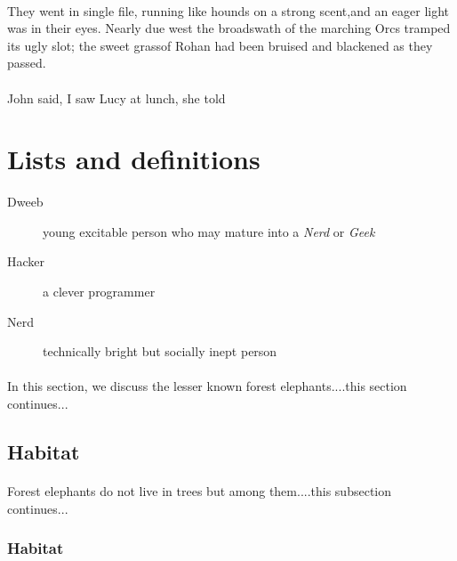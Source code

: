 \documentclass{article}
\begin{document}
\paragraph{}\begin{center}They went in single file, running like hounds on a strong scent,and an eager light was in their eyes. Nearly due west the broadswath of the marching  \small{Orcs tramped }  its ugly slot; the sweet grassof Rohan had been bruised and blackened as they passed. \end{center}\paragraph{}\paragraph{}John said, I saw Lucy at lunch, she told \section*{Lists and definitions }
\begin{description}\item[Dweeb ]
young excitable person who may mature    into a  \emph{Nerd } or  \emph{Geek }\item[Hacker ]
a clever programmer \item[Nerd ]
technically bright but socially inept person \end{description}\paragraph{}In this section, we discuss the lesser known forest elephants....this section continues... \subsection*{Habitat }
\paragraph{}Forest elephants do not live in trees but among them....this subsection continues...  \subsubsection*{Habitat }
\end{document}
